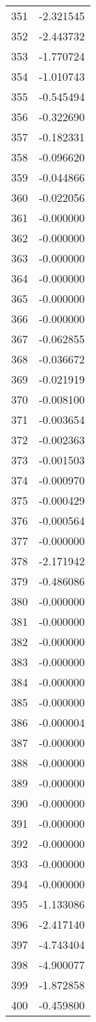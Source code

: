 \documentclass[12pt]{article}
\begin{document}
\begin{longtable}{@{}cc@{}}
351 & -2.321545 \\
352 & -2.443732 \\
353 & -1.770724 \\
354 & -1.010743 \\
355 & -0.545494 \\
356 & -0.322690 \\
357 & -0.182331 \\
358 & -0.096620 \\
359 & -0.044866 \\
360 & -0.022056 \\
361 & -0.000000 \\
362 & -0.000000 \\
363 & -0.000000 \\
364 & -0.000000 \\
365 & -0.000000 \\
366 & -0.000000 \\
367 & -0.062855 \\
368 & -0.036672 \\
369 & -0.021919 \\
370 & -0.008100 \\
371 & -0.003654 \\
372 & -0.002363 \\
373 & -0.001503 \\
374 & -0.000970 \\
375 & -0.000429 \\
376 & -0.000564 \\
377 & -0.000000 \\
378 & -2.171942 \\
379 & -0.486086 \\
380 & -0.000000 \\
381 & -0.000000 \\
382 & -0.000000 \\
383 & -0.000000 \\
384 & -0.000000 \\
385 & -0.000000 \\
386 & -0.000004 \\
387 & -0.000000 \\
388 & -0.000000 \\
389 & -0.000000 \\
390 & -0.000000 \\
391 & -0.000000 \\
392 & -0.000000 \\
393 & -0.000000 \\
394 & -0.000000 \\
395 & -1.133086 \\
396 & -2.417140 \\
397 & -4.743404 \\
398 & -4.900077 \\
399 & -1.872858 \\
400 & -0.459800 \\

\end{longtable}
\end{document}
